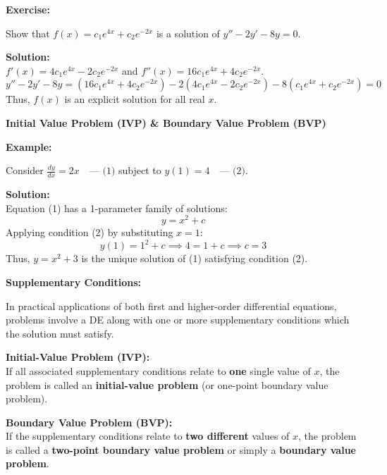 \documentclass[11pt,a4paper]{article}
\newcommand{\Heading}[1]{\vspace{0.3cm}\noindent\textbf{\textcolor{AcademicGreen}{\large #1}}\par\vspace{0.15cm}}
\begin{document}
\Heading{Exercise:}
Show that $f(x) = c_1 e^{4x} + c_2 e^{-2x}$ is a solution of $y'' - 2y' - 8y = 0$.

\noindent\textbf{Solution:} \\
$f'(x) = 4c_1 e^{4x} - 2c_2 e^{-2x}$ and $f''(x) = 16c_1 e^{4x} + 4c_2 e^{-2x}$.
\[ y'' - 2y' - 8y = (16c_1 e^{4x} + 4c_2 e^{-2x}) - 2(4c_1 e^{4x} - 2c_2 e^{-2x}) - 8(c_1 e^{4x} + c_2 e^{-2x}) = 0 \]
Thus, $f(x)$ is an explicit solution for all real $x$.

\newpage


\Heading{Initial Value Problem (IVP) \& Boundary Value Problem (BVP)}

\Heading{Example:}
Consider $\frac{dy}{dx} = 2x \quad \text{--- (1)}$ subject to $y(1) = 4 \quad \text{--- (2)}$.

\noindent\textbf{Solution:} \\
Equation (1) has a 1-parameter family of solutions:
\begin{equation}
    y = x^2 + c \label{eq:page8_fam}
\end{equation}
Applying condition (2) by substituting $x = 1$:
\[ y(1) = 1^2 + c \implies 4 = 1 + c \implies c = 3 \]
Thus, $y = x^2 + 3$ is the unique solution of (1) satisfying condition (2).

\Heading{Supplementary Conditions:}
In practical applications of both first and higher-order differential equations, problems involve a DE along with one or more supplementary conditions which the solution must satisfy.

\vspace{0.2cm}
\begin{tcolorbox}[greenbox]
    \textbf{\textcolor{AcademicGreen}{Initial-Value Problem (IVP):}} \\
    If all associated supplementary conditions relate to \textbf{one} single value of $x$, the problem is called an \textbf{initial-value problem} (or one-point boundary value problem).
\end{tcolorbox}


\begin{tcolorbox}[greenbox]
    \textbf{\textcolor{AcademicGreen}{Boundary Value Problem (BVP):}} \\
    If the supplementary conditions relate to \textbf{two different} values of $x$, the problem is called a \textbf{two-point boundary value problem} or simply a \textbf{boundary value problem}.
\end{tcolorbox}
\end{document}
